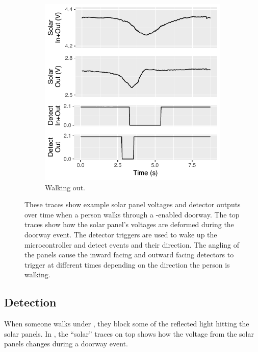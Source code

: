 \begin{figure}[t]
\begin{subfigure}[b]{0.5\textwidth}
		\includegraphics[width=\columnwidth]{figs/tracesout.pdf}
		\caption{Walking out.}
		\label{fig:tracesout}
	\end{subfigure}
	\caption{These traces show example solar panel voltages and detector outputs over time when a person walks through a \sysname-enabled doorway. The top traces show how the solar panel's voltages are deformed during the doorway event. The detector triggers are used to wake up the microcontroller and detect events and their direction. The angling of the panels cause the inward facing and outward facing detectors to trigger at different times depending on the direction the person is walking.\label{fig:traces}}
\end{figure}

\subsection{Detection}
\label{sec:detection}




When someone walks under \sysname, they block some of the reflected light hitting the solar panels.
In , the ``solar'' traces on top shows how the voltage from the solar panels changes during a doorway event.

